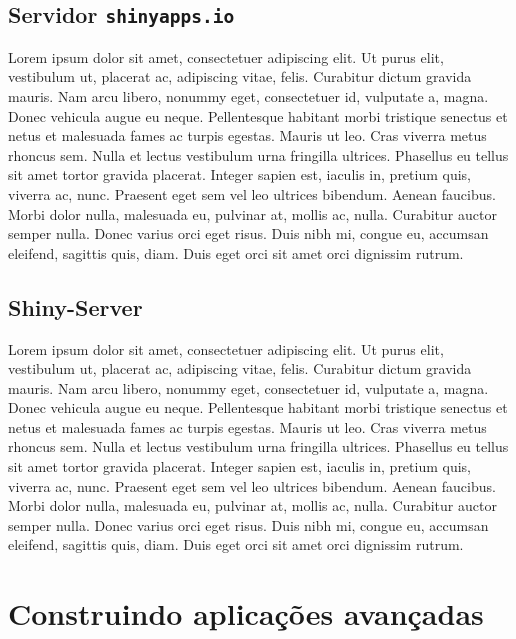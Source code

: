 \documentclass[]{book}
\begin{document}
\section{\texorpdfstring{Servidor
\texttt{shinyapps.io}}{Servidor shinyapps.io}}\label{servidor-shinyapps.io}

Lorem ipsum dolor sit amet, consectetuer adipiscing elit. Ut purus elit,
vestibulum ut, placerat ac, adipiscing vitae, felis. Curabitur dictum
gravida mauris. Nam arcu libero, nonummy eget, consectetuer id,
vulputate a, magna. Donec vehicula augue eu neque. Pellentesque habitant
morbi tristique senectus et netus et malesuada fames ac turpis egestas.
Mauris ut leo. Cras viverra metus rhoncus sem. Nulla et lectus
vestibulum urna fringilla ultrices. Phasellus eu tellus sit amet tortor
gravida placerat. Integer sapien est, iaculis in, pretium quis, viverra
ac, nunc. Praesent eget sem vel leo ultrices bibendum. Aenean faucibus.
Morbi dolor nulla, malesuada eu, pulvinar at, mollis ac, nulla.
Curabitur auctor semper nulla. Donec varius orci eget risus. Duis nibh
mi, congue eu, accumsan eleifend, sagittis quis, diam. Duis eget orci
sit amet orci dignissim rutrum.

\section{Shiny-Server}\label{shiny-server}

Lorem ipsum dolor sit amet, consectetuer adipiscing elit. Ut purus elit,
vestibulum ut, placerat ac, adipiscing vitae, felis. Curabitur dictum
gravida mauris. Nam arcu libero, nonummy eget, consectetuer id,
vulputate a, magna. Donec vehicula augue eu neque. Pellentesque habitant
morbi tristique senectus et netus et malesuada fames ac turpis egestas.
Mauris ut leo. Cras viverra metus rhoncus sem. Nulla et lectus
vestibulum urna fringilla ultrices. Phasellus eu tellus sit amet tortor
gravida placerat. Integer sapien est, iaculis in, pretium quis, viverra
ac, nunc. Praesent eget sem vel leo ultrices bibendum. Aenean faucibus.
Morbi dolor nulla, malesuada eu, pulvinar at, mollis ac, nulla.
Curabitur auctor semper nulla. Donec varius orci eget risus. Duis nibh
mi, congue eu, accumsan eleifend, sagittis quis, diam. Duis eget orci
sit amet orci dignissim rutrum.

\chapter{Construindo aplicações
avançadas}\label{construindo-aplicacoes-avancadas}
\end{document}
